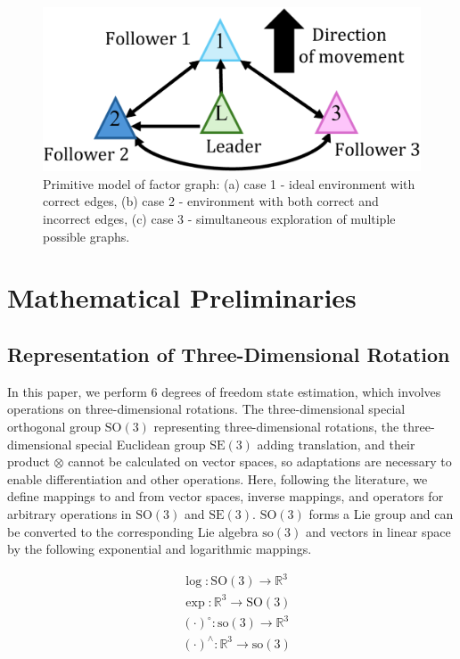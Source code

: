 \documentclass[a4paper,fleqn,10pt,twocolumn]{SICE_ISCS}
\begin{document}
\begin{figure}[t]
	\begin{center}
		\includegraphics[width=\linewidth]{Fig/Topology.eps}
		\caption{Primitive model of factor graph: (a) case 1 - ideal environment with correct edges, (b) case 2 - environment with both correct and incorrect edges, (c) case 3 - simultaneous exploration of multiple possible graphs.}
		\label{fig:primitive_model}
	\end{center}
	\vspace{-2mm}
\end{figure}

\section{Mathematical Preliminaries}
\subsection{Representation of Three-Dimensional Rotation}
In this paper, we perform 6 degrees of freedom state estimation, which involves operations on three-dimensional rotations. The three-dimensional special orthogonal group $\mathrm{SO}(3)$ representing three-dimensional rotations, the three-dimensional special Euclidean group $\mathrm{SE}(3)$ adding translation, and their product $\otimes$ cannot be calculated on vector spaces, so adaptations are necessary to enable differentiation and other operations. Here, following the literature\cite{VINS-IMU}, we define mappings to and from vector spaces, inverse mappings, and operators for arbitrary operations in $\mathrm{SO}(3)$ and $\mathrm{SE}(3)$. $\mathrm{SO}(3)$ forms a Lie group and can be converted to the corresponding Lie algebra $\mathrm{so}(3)$ and vectors in linear space by the following exponential and logarithmic mappings.

\begin{equation}
\begin{aligned}
& \log : \mathrm{SO}(3) \rightarrow \mathbb{R}^{3} \\
& \exp : \mathbb{R}^{3} \rightarrow \mathrm{SO}(3) \\
& \left(\cdot\right)^{\circ}: \mathrm{so}(3) \rightarrow \mathbb{R}^{3} \\
& \left(\cdot\right)^{\wedge}: \mathbb{R}^{3} \rightarrow \mathrm{so}(3)
\end{aligned}
\end{equation}
\end{document}
